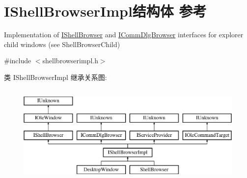 \hypertarget{struct_i_shell_browser_impl}{}\section{I\+Shell\+Browser\+Impl结构体 参考}
\label{struct_i_shell_browser_impl}


Implementation of \hyperlink{interface_i_shell_browser}{I\+Shell\+Browser} and \hyperlink{interface_i_comm_dlg_browser}{I\+Comm\+Dlg\+Browser} interfaces for explorer child windows (see Shell\+Browser\+Child)  




{\ttfamily \#include $<$shellbrowserimpl.\+h$>$}

类 I\+Shell\+Browser\+Impl 继承关系图\+:\begin{figure}[H]
\begin{center}
\leavevmode
\includegraphics[height=5.000000cm]{struct_i_shell_browser_impl}
\end{center}
\end{figure}
